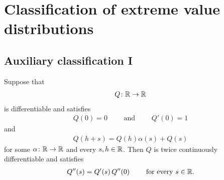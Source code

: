 \chapter{Classification of extreme value distributions}

\section{Auxiliary classification I}

\begin{lemma}
  \label{lem:ode-of-order-two-for-Q}
  Suppose that
  \begin{align*}
  Q \colon \mathbb{R} \to \mathbb{R}
  \end{align*}
  is differentiable and satisfies
  \begin{align*}
  Q(0) = 0 \qquad \text{ and } \qquad Q'(0) = 1
  \end{align*}
  and
  \begin{align*}
  Q(h+s) = Q(h) \alpha(s) + Q(s)
  \end{align*}
  for some $\alpha \colon \mathbb{R} \to \mathbb{R}$ and every $s,h \in \mathbb{R}$.
  Then $Q$ is twice continuously differentiable and satisfies
  \begin{align}
    Q''(s) = Q'(s) \, Q''(0) \qquad \text{ for every } s \in \mathbb{R} .
  \end{align}
\end{lemma}
